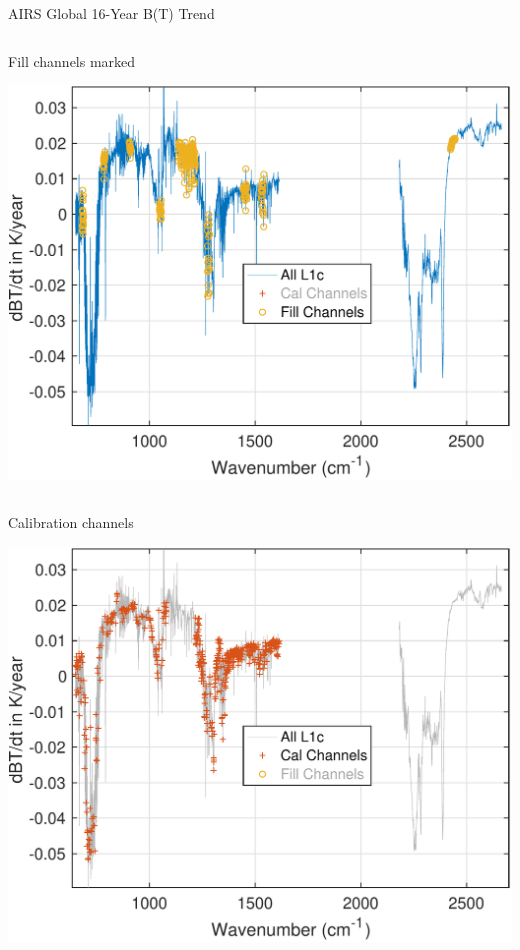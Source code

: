 \documentclass[10pt,t]{beamer}
\begin{document}
\begin{frame}[label={sec:org4503062}]{AIRS Global 16-Year B(T) Trend}
\begin{columns}
\begin{column}{0.55\columnwidth}
\begin{block}{\footnotesize Fill channels marked}
\vspace{-0.1in}
\begin{center}
\includegraphics[width=0.85\linewidth]{./Figs/Pdf/rand_global_trend_l1c_overview_fill_marked.pdf}
\end{center}
\end{block}
\end{column}
\end{columns}


\vspace{-0.25in}

\begin{columns}
\begin{column}{0.55\columnwidth}
\begin{block}{\footnotesize Calibration channels}
\vspace{-0.1in}
\begin{center}
\includegraphics[width=0.75\linewidth]{./Figs/Pdf/rand_global_trend_l1c_overview_calfit_marked.pdf}
\end{center}
\end{block}
\end{column}



\end{columns}
\end{frame}
\end{document}
